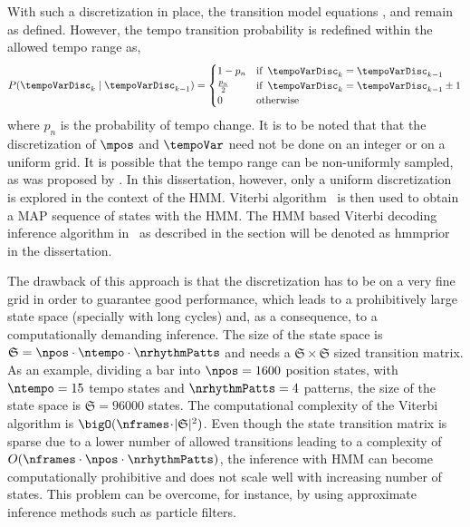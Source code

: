 With such a discretization in place, the transition model equations ,  and  remain as defined. However, the tempo transition probability is redefined within the allowed tempo range as, 
\begin{equation} \label{eqn:bpm:hmmntrans}
P(\tempoVarDisc_{k} \mid \tempoVarDisc_{k-1}) = 
\begin{cases}
1-p_{n} & \text{if} \,\,\, \tempoVarDisc_{k}=\tempoVarDisc_{k-1} \\
\frac{p_n}{2} & \text{if} \,\,\, \tempoVarDisc_{k}=\tempoVarDisc_{k-1} \pm 1 \\
0 & \text{otherwise}
\end{cases}
\end{equation}
where $p_n$ is the probability of tempo change. It is to be noted that that the discretization of $\mpos$ and $\tempoVar$ need not be done on an integer or on a uniform grid. It is possible that the tempo range can be non-uniformly sampled, as was proposed by . In this dissertation, however, only a uniform discretization is explored in the context of the \gls{HMM}. Viterbi algorithm~\cite{rabiner:89:tutorial} is then used to obtain a \gls{MAP} sequence of states with the \gls{HMM}. The \gls{HMM} based Viterbi decoding inference algorithm in \bpmodel\ as described in the section will be denoted as \acrshort{hmmprior} in the dissertation. 

The drawback of this approach is that the discretization has to be on a very fine grid in order to guarantee good performance, which leads to a prohibitively large state space (specially with long cycles) and, as a consequence, to a computationally demanding inference. The size of the state space is $\mathfrak{S} = \npos \cdot \ntempo \cdot \nrhythmPatts$ and needs a $\mathfrak{S}\times\mathfrak{S}$ sized transition matrix. As an example, dividing a bar into $\npos = 1600$ position states, with $\ntempo = 15$ tempo states and $\nrhythmPatts = 4$ patterns, the size of the state space is $\mathfrak{S} = 96000$ states. The computational complexity of the Viterbi algorithm is $\bigO(\nframes\!\cdot\!\lvert \mathfrak{S} \rvert ^2)$. Even though the state transition matrix is sparse due to a lower number of allowed transitions leading to a complexity of $O(\nframes \cdot \npos \cdot \nrhythmPatts)$, the inference with \gls{HMM} can become computationally prohibitive and does not scale well with increasing number of states. This problem can be overcome, for instance, by using approximate inference methods such as particle filters. 
